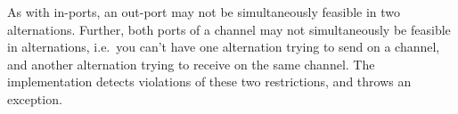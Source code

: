 

As with in-ports, an out-port may not be simultaneously feasible in two
alternations.  Further, both ports of a channel may not simultaneously be
feasible in alternations, i.e.~you can't have one alternation trying to send
on a channel, and another alternation trying to receive on the same channel.
The implementation detects violations of these two restrictions, and throws an
exception.
